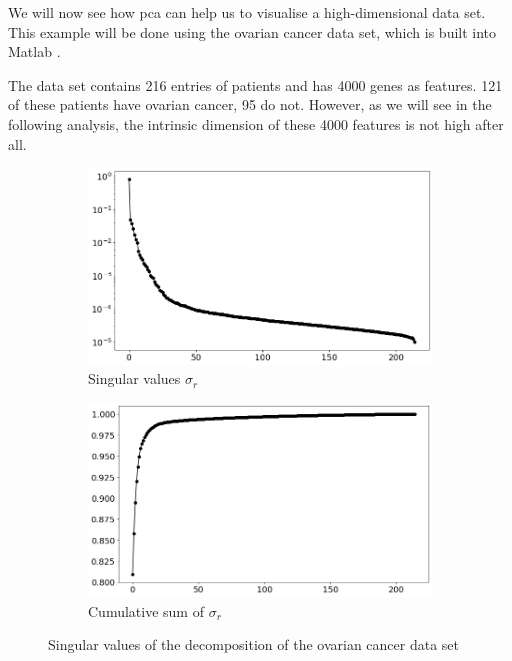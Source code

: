 We will now see how \gls{pca} can help us to visualise a high-dimensional data set.
This example will be done using the ovarian cancer data set, which is built into Matlab \cite{brunton2019data}.

The data set contains 216 entries of patients and has 4000 genes as features.
121 of these patients have ovarian cancer, 95 do not.
However, as we will see in the following analysis, the intrinsic dimension of these 4000 features is not high after all.

\begin{figure}[h]
  \centering
  \begin{subfigure}{0.49\textwidth}
      \includegraphics[width=\textwidth]{external_content/media/ovarian_cancer/explained_variance.png}
      \caption{Singular values $\sigma_r$}
      \label{fig:ovarianLog}
  \end{subfigure}
  \hfill
  \begin{subfigure}{0.49\textwidth}
      \includegraphics[width=\textwidth]{external_content/media/ovarian_cancer/cumulative_sum.png}
      \caption{Cumulative sum of $\sigma_r$}
      \label{fig:ovarianCumsum}
  \end{subfigure}
  \caption{Singular values of the decomposition of the ovarian cancer data set}
  \label{fig:ovarianSpecs}
\end{figure}


